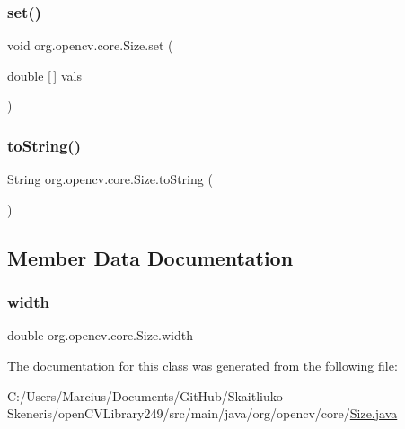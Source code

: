\subsubsection{\texorpdfstring{set()}{set()}}
{\footnotesize\ttfamily void org.\+opencv.\+core.\+Size.\+set (\begin{DoxyParamCaption}\item[{double \mbox{[}$\,$\mbox{]}}]{vals }\end{DoxyParamCaption})}

\mbox{\label{classorg_1_1opencv_1_1core_1_1_size_a6def71949e570165a90058d5c0f50254}} 
\subsubsection{\texorpdfstring{to\+String()}{toString()}}
{\footnotesize\ttfamily String org.\+opencv.\+core.\+Size.\+to\+String (\begin{DoxyParamCaption}{ }\end{DoxyParamCaption})}



\subsection{Member Data Documentation}
\mbox{\label{classorg_1_1opencv_1_1core_1_1_size_a7119ef5de69592ee53b253977ec86867}} 
\subsubsection{\texorpdfstring{width}{width}}
{\footnotesize\ttfamily double org.\+opencv.\+core.\+Size.\+width}



The documentation for this class was generated from the following file\+:\begin{DoxyCompactItemize}
\item 
C\+:/\+Users/\+Marcius/\+Documents/\+Git\+Hub/\+Skaitliuko-\/\+Skeneris/open\+C\+V\+Library249/src/main/java/org/opencv/core/\mbox{\hyperlink{_size_8java}{Size.\+java}}\end{DoxyCompactItemize}
